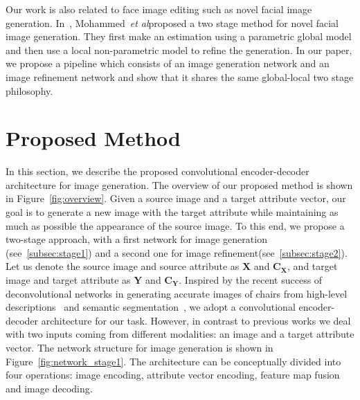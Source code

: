\documentclass[10pt,twocolumn,letterpaper]{article}
\def\etal{\emph{et al}\onedot}
\begin{document}
Our work is also related to face image editing such as novel facial image generation.
In~\cite{Mohammed-siggraph09}, Mohammed~\etal proposed a two stage method for novel facial image generation.
They first make an estimation using a parametric global model and then use a local non-parametric model to refine the generation.
In our paper, we propose a pipeline which consists of an image generation network and an image refinement network
and show that it shares the same global-local two stage philosophy.



\vspace{-1mm}
\section{Proposed Method}
\label{sec:method}
In this section, we describe the proposed convolutional encoder-decoder architecture for image generation. The overview of our proposed method is shown in Figure~\ref{fig:overview}.
Given a source image and a target attribute vector, our goal is to generate a new image with the target attribute while maintaining as much as possible the appearance of the source image. To this end, we propose a two-stage approach, with a first network for image generation (see~\ref{subsec:stage1}) and a second one for image refinement(see~\ref{subsec:stage2}).
Let us denote the source image and source attribute as $\mathbf{X}$ and $\mathbf{C_X}$, and target image and target attribute as $\mathbf{Y}$ and $\mathbf{C_Y}$.
Inspired by the recent success of deconvolutional networks in generating accurate images of chairs
from high-level descriptions~\cite{Dosovitskiy-cvpr15} and semantic segmentation~\cite{Long-cvpr15,Noh-iccv15},
we adopt a convolutional encoder-decoder architecture for our task.
However, in contrast to previous works we deal with two inputs coming from different modalities:
an image and a target attribute vector.
The network structure for image generation is shown in Figure~\ref{fig:network_stage1}.
The architecture can be conceptually divided into four operations:
image encoding, attribute vector encoding, feature map fusion and image decoding.
\end{document}
